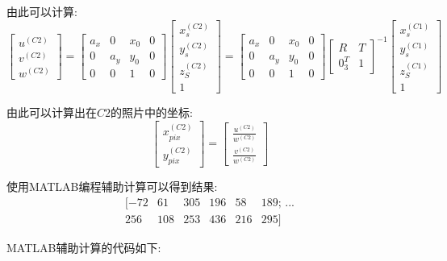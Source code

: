 \documentclass[]{article}
\begin{document}
\begin{enumerate}
由此可以计算:
$$
\begin{bmatrix}u^{(C2)} \\ v^{(C2)} \\ w^{(C2)}\end{bmatrix}=\begin{bmatrix}a_x & 0 & x_0 & 0 \\ 0 & a_y & y_0 & 0 \\ 0 & 0 & 1 & 0 \end{bmatrix} \begin{bmatrix}x_s^{(C2)} \\ y_s^{(C2)} \\ z_S^{(C2)} \\ 1\end{bmatrix}=\begin{bmatrix}a_x & 0 & x_0 & 0 \\ 0 & a_y & y_0 & 0 \\ 0 & 0 & 1 & 0 \end{bmatrix}\begin{bmatrix}R & T \\ 0_3^T & 1 \end{bmatrix}^{-1}\begin{bmatrix} x_s^{(C1)} \\ y_s^{(C1)} \\ z_S^{(C1)} \\ 1\end{bmatrix}
$$

由此可以计算出在\(C2\)的照片中的坐标:
$$
\begin{bmatrix}x_{pix}^{(C2)} \\ y_{pix}^{(C2)}\end{bmatrix}=\begin{bmatrix}\frac{u^{(C2)}}{w^{(C2)}} \\ \frac{v^{(C2)}}{w^{(C2)}} \end{bmatrix}
$$

使用MATLAB编程辅助计算可以得到结果:
$$
\begin{matrix}[-72 & 61& 305 & 196 & 58 & 189;\,... \\ 256 & 108 & 253 & 436 & 216 & 295] \end{matrix}
$$

MATLAB辅助计算的代码如下:


\end{enumerate}
\end{document}
